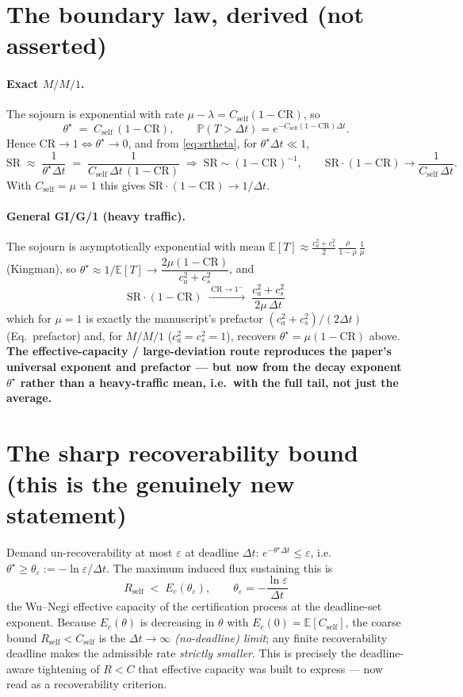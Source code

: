 \documentclass[11pt]{article}
\newcommand{\Rself}{R_{\mathrm{self}}}
\newcommand{\Cself}{C_{\mathrm{self}}}
\newcommand{\CR}{\mathrm{CR}}
\newcommand{\SR}{\mathrm{SR}}
\newcommand{\E}{\mathbb{E}}
\newcommand{\Prob}{\mathbb{P}}
\begin{document}
\section{The boundary law, derived (not asserted)}
\paragraph{Exact $M/M/1$.} The sojourn is exponential with rate $\mu-\lambda=\Cself(1-\CR)$, so
\[
\theta^\star \;=\; \Cself\,(1-\CR),
\qquad
\Prob(T>\Delta t)=e^{-\Cself(1-\CR)\Delta t}.
\]
Hence $\CR\to1 \iff \theta^\star\to0$, and from \eqref{eq:srtheta}, for $\theta^\star\Delta t\ll1$,
\[
\SR \;\approx\; \frac{1}{\theta^\star\Delta t}\;=\;\frac{1}{\Cself\,\Delta t\,(1-\CR)}
\;\Longrightarrow\;
\SR\sim(1-\CR)^{-1},
\qquad
\SR\cdot(1-\CR)\to \frac{1}{\Cself\,\Delta t}.
\]
With $\Cself=\mu=1$ this gives $\SR\cdot(1-\CR)\to 1/\Delta t$.

\paragraph{General GI/G/1 (heavy traffic).} The sojourn is asymptotically exponential with mean
$\E[T]\approx \tfrac{c_a^2+c_s^2}{2}\,\tfrac{\rho}{1-\rho}\,\tfrac1\mu$ (Kingman), so
$\theta^\star\approx 1/\E[T]\to \dfrac{2\mu(1-\CR)}{c_a^2+c_s^2}$, and
\begin{equation}
\boxed{\;\SR\cdot(1-\CR)\;\xrightarrow{\;\CR\to1^-\;}\;\frac{c_a^2+c_s^2}{2\mu\,\Delta t}\;}
\label{eq:prefactor}
\end{equation}
which for $\mu=1$ is exactly the manuscript's prefactor $(c_a^2+c_s^2)/(2\Delta t)$ (Eq.~prefactor) and,
for $M/M/1$ ($c_a^2=c_s^2=1$), recovers $\theta^\star=\mu(1-\CR)$ above. \textbf{The effective-capacity /
large-deviation route reproduces the paper's universal exponent and prefactor --- but now from the decay
exponent $\theta^\star$ rather than a heavy-traffic mean, i.e.\ with the full tail, not just the average.}

\section{The sharp recoverability bound (this is the genuinely new statement)}
Demand un-recoverability at most $\varepsilon$ at deadline $\Delta t$: $e^{-\theta^\star\Delta t}\le\varepsilon$,
i.e.\ $\theta^\star\ge \theta_\varepsilon:=-\ln\varepsilon/\Delta t$. The maximum induced flux sustaining this is
\begin{equation}
\boxed{\;\Rself \;<\; E_c(\theta_\varepsilon),\qquad \theta_\varepsilon=-\frac{\ln\varepsilon}{\Delta t}\;}
\label{eq:sharp}
\end{equation}
the Wu--Negi effective capacity of the certification process at the deadline-set exponent. Because
$E_c(\theta)$ is decreasing in $\theta$ with $E_c(0)=\E[\Cself]$, the coarse bound $\Rself<\Cself$ is the
\emph{$\Delta t\to\infty$ (no-deadline) limit}; any finite recoverability deadline makes the admissible
rate \emph{strictly smaller}. This is precisely the deadline-aware tightening of $R<C$ that effective
capacity was built to express --- now read as a recoverability criterion.
\end{document}
